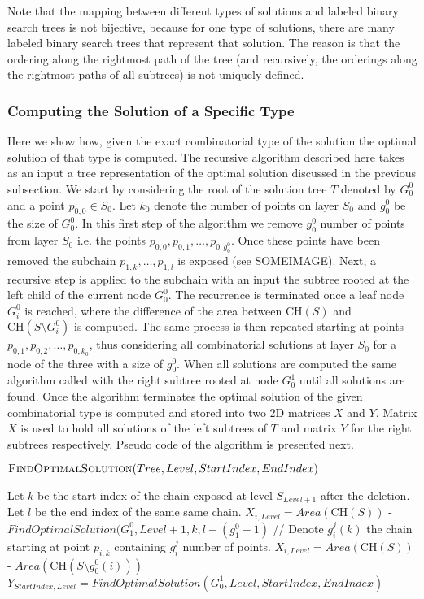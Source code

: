 \documentclass[lotsofwhite]{patmorin}
\newcommand{\ch}{\mathrm{CH}}
\begin{document}
Note that the mapping between different types of solutions and labeled binary search trees is
not bijective, because for one type of solutions, there are many labeled binary search trees
that represent that solution. The reason is that the ordering along the rightmost path of the
tree (and recursively, the orderings along the rightmost paths of all subtrees) is not
uniquely defined.

\subsubsection{Computing the Solution of a Specific Type}

Here we show how, given the exact combinatorial type of the solution the optimal solution of
that type is computed. The recursive algorithm described here takes as an input a tree
representation of the optimal solution discussed in the previous subsection. We start by
considering the root of the solution tree $T$ denoted by $G_0^0$ and a point $p_{0,0} \in
S_0$. Let $k_0$ denote the number of points on layer $S_0$ and $g_0^0$ be the size of
$G_0^0$. In this first step of the algorithm we remove $g_0^0$ number of points from layer
$S_0$ i.e. the points $p_{0,0}, p_{0,1}, \dots ,p_{0,g_0^0}$. Once these points have been
removed the subchain $p_{1,k}, \ldots, p_{1,l}$ is exposed (see SOMEIMAGE). Next, a recursive
step is applied to the subchain with an input the subtree rooted at the left child of the
current node $G_0^0$. The recurrence is terminated once a leaf node $G_i^0$ is reached, where
the difference of the area between $\ch(S)$ and $\ch(S \setminus G_i^0)$ is computed. The same
process is then repeated starting at points $p_{0,1}, p_{0,2}, \dots , p_{0,k_0}$, thus
considering all combinatorial solutions at layer $S_0$ for a node of the three with a size of
$g_0^0$.  When all solutions are computed the same algorithm called with the right subtree
rooted at node $G_0^1$ until all solutions are found. Once the algorithm terminates the
optimal solution of the given combinatorial type is computed and stored into two 2D matrices $X$ 
and $Y$. Matrix $X$ is used to hold all solutions of the left subtrees of $T$ and matrix $Y$
for the right subtrees respectively. Pseudo code of the algorithm is presented next.

\noindent$\textsc{FindOptimalSolution}(Tree, Level, StartIndex, EndIndex)$
\begin{algorithmic}
     \STATE Let $k$ be the start index of the chain exposed at level $S_{Level+1}$ after the deletion.
     \STATE Let $l$ be the end index of the same same chain.
     \STATE $X_{i,Level} = Area(\ch(S))$ - $FindOptimalSolution(G_1^0, Level+1, k, l-(g_1^0 - 1)$
   \ELSE
     \STATE // Denote $g_i^j(k)$ the chain starting at point $p_{i,k}$ containing $g_i^j$ number of points.
     \STATE $X_{i,Level} = Area(\ch(S))$ - $Area(\ch(S \setminus g_0^0(i)))$
   \ENDIF
   \ENDFOR
     \STATE $Y_{StartIndex,Level} = FindOptimalSolution(G_0^1, Level, StartIndex, EndIndex)$
   \ENDIF
\end{algorithmic}
\end{document}
